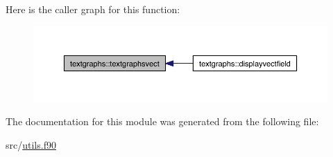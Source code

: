 Here is the caller graph for this function\-:
\nopagebreak
\begin{figure}[H]
\begin{center}
\leavevmode
\includegraphics[width=350pt]{classtextgraphs_a3ce903686e3a69e50f07b7f1461c53c6_icgraph}
\end{center}
\end{figure}




The documentation for this module was generated from the following file\-:\begin{DoxyCompactItemize}
\item 
src/\hyperlink{utils_8f90}{utils.\-f90}\end{DoxyCompactItemize}
